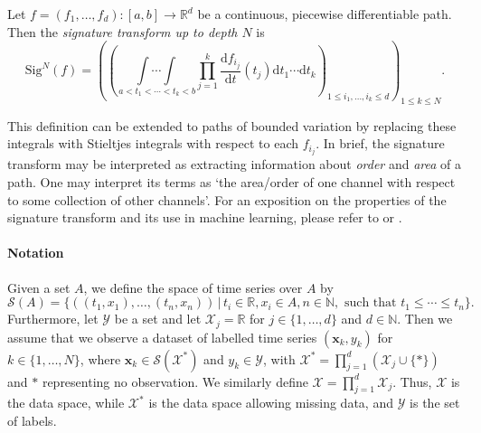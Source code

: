 \documentclass{article}
\newcommand{\reals}{\mathbb{R}}
\newcommand{\naturals}{\mathbb{N}}
\newcommand{\sig}{\mathrm{Sig}^N}
\newcommand{\dataspace}{\mathcal{X}}
\newcommand{\lspace}{\mathcal{Y}}
\newcommand{\seriesspace}{\mathcal{S}}
\begin{document}
Let $f = (f_1, \dots, f_d) \colon [a, b] \to \reals^d$ be a continuous, piecewise
differentiable path. Then the \emph{signature transform up to depth $N$}
is
\begin{equation}\label{eq:signature}
    \sig(f)=\left(\left(\underset{\,a<t_{1}<\cdots<t_{k}<b}{\int \cdots \int} \prod_{j=1}^{k} \frac{\mathrm{d} f_{i_{j}}}{\mathrm{d} t}\left(t_{j}\right) \mathrm{d} t_{1} \cdots \mathrm{d} t_{k}\right)_{1 \leq i_{1}, \ldots, i_{k} \leq d}\right)_{1 \leq k \leq N}.
\end{equation}

This definition can be extended to paths of bounded variation by
replacing these integrals with Stieltjes integrals with respect to each
$f_{i_j}$.
%
In brief, the signature transform may be interpreted as extracting
information about \emph{order} and \emph{area} of a path.
%
One may interpret its terms as `the area/order of one channel with
respect to some collection of other channels'.
For an exposition on the properties of the signature transform and its
use in machine learning, please refer to \citet{primer2016} or \citet[Appendix A]{kidger2019deep}.

\paragraph{Notation}
%
Given a set $A$, we define the space of time series over $A$ by
%
\begin{equation}
    \seriesspace(A) = \{((t_1, x_1), \ldots, (t_n, x_n)) \,\vert\, t_i \in \reals, x_i \in A, n \in \naturals, \text{ such that } t_1 \leq \cdots \leq t_n\}.\label{eq:seriesspace}
\end{equation}
%
Furthermore, let $\lspace$ be a set and let $\dataspace_j = \reals$ for $j \in \{1,
\ldots, d\}$ and $d \in \naturals$. Then we assume that we observe
a dataset of labelled time series $(\mathbf{x}_k, y_k)$ for $k \in \{1,
\ldots, N\}$, where $\mathbf{x}_k \in \seriesspace(\dataspace^*)$ and
$y_k \in \lspace$, with $\dataspace^* = \prod_{j = 1}^d(\dataspace_j
\cup \{*\})$ and $*$ representing no observation.
%
We similarly define $\dataspace = \prod_{j = 1}^d\dataspace_j$. Thus,
$\dataspace$ is the data space, while $\dataspace^*$ is the data space
allowing missing data, and $\lspace$ is the set of labels.
\end{document}
